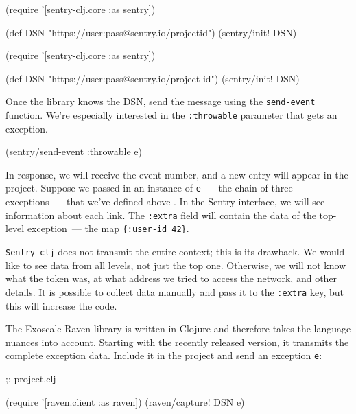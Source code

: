 \ifx\DEVICETYPE\MOBILE

\begin{clojure}
(require '[sentry-clj.core :as sentry])

(def DSN
 "https://user:pass@sentry.io/projectid")
(sentry/init! DSN)
\end{clojure}

\else

\begin{clojure}
(require '[sentry-clj.core :as sentry])

(def DSN "https://user:pass@sentry.io/project-id")
(sentry/init! DSN)
\end{clojure}

\fi

Once the library knows the DSN, send the message using the \verb|send-event| function. We're especially interested in the \verb|:throwable| parameter that gets an exception.

\begin{clojure}
(sentry/send-event {:throwable e})
\end{clojure}

In response, we will receive the event number, and a new entry will appear in the project.
Suppose we passed in an instance of \verb|e|~--- the chain of three exceptions~--- that we've defined above . In the Sentry interface, we will see information about each link. The \verb|:extra| field will contain the data of the top-level exception~--- the map \verb|{:user-id 42}|.

\verb|Sentry-clj| does not transmit the entire context; this is its drawback. We would like to see data from all levels, not just the top one. Otherwise, we will not know what the token was, at what address we tried to access the network, and other details. It is possible to collect data manually and pass it to the \verb|:extra| key, but this will increase the code.


The Exoscale Raven library is written in Clojure and therefore takes the language nuances into account. Starting with the recently released version, it transmits the complete exception data. Include it in the project and send an exception \verb|e|:

\begin{clojure}
 ;; project.clj

(require '[raven.client :as raven])
(raven/capture! DSN e)
\end{clojure}

